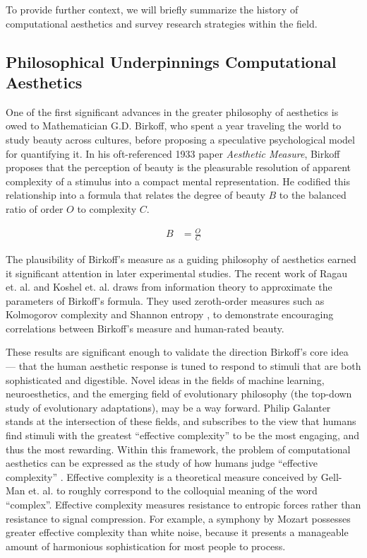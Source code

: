 \documentclass[midd]{thesis}
\begin{document}
To provide further context, we will briefly summarize the history of computational aesthetics and survey research strategies within the field.

\subsection{Philosophical Underpinnings Computational Aesthetics}

One of the first significant advances in the greater philosophy of aesthetics is owed to Mathematician G.D. Birkoff, who spent a year traveling the world to study beauty across cultures, before proposing a speculative psychological model for quantifying it. In his oft-referenced 1933 paper \emph{Aesthetic Measure}, Birkoff proposes that the perception of beauty is the pleasurable resolution of apparent complexity of a stimulus into a compact mental representation. He codified this relationship into a formula that relates the degree of beauty $B$ to the balanced ratio of order $O$ to complexity $C$.

\begin{align*}
B &= \frac{O}{C}
\end{align*}

The plausibility of Birkoff's measure as a guiding philosophy of aesthetics earned it significant attention in later experimental studies. The recent work of Ragau et. al. and Koshel et. al. draws from information theory to approximate the parameters of Birkoff's formula. They used zeroth-order measures such as Kolmogorov complexity and Shannon entropy \cite{rigau-1, koshelev-1}, to demonstrate encouraging correlations between Birkoff's measure and human-rated beauty.

These results are significant enough to validate the direction Birkoff's core idea --- that the human aesthetic response is tuned to respond to stimuli that are both sophisticated and digestible. Novel ideas in the fields of machine learning, neuroesthetics, and the emerging field of evolutionary philosophy (the top-down study of evolutionary adaptations), may be a way forward.
Philip Galanter stands at the intersection of these fields, and subscribes to the view that humans find stimuli with the greatest ``effective complexity'' to be the most engaging, and thus the most rewarding. Within this framework, the problem of computational aesthetics can be expressed as the study of how humans judge ``effective complexity'' \cite{galanter-1,galanter-2,galanter-3,galanter-4}. Effective complexity is a theoretical measure conceived by Gell-Man et. al. \cite{gell2004effective} to roughly correspond to the colloquial meaning of the word ``complex''. Effective complexity measures resistance to entropic forces rather than resistance to signal compression. For example, a symphony by Mozart possesses greater effective complexity than white noise, because it presents a manageable amount of harmonious sophistication for most people to process.
\end{document}
